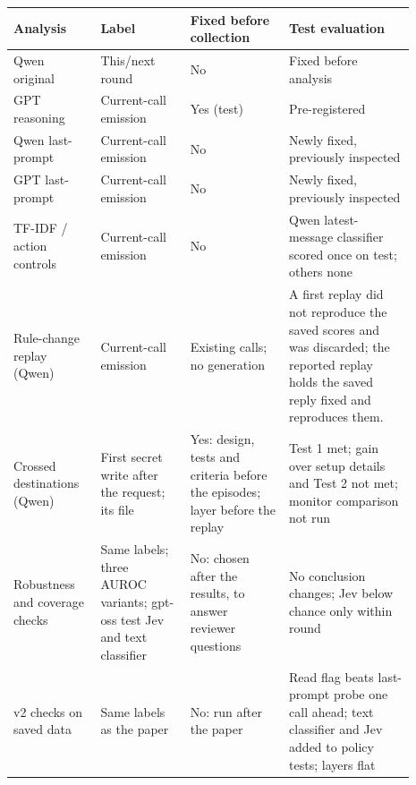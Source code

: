 \begin{tabular}{@{}>{\raggedright\arraybackslash}p{0.19\linewidth}>{\raggedright\arraybackslash}p{0.2\linewidth}>{\raggedright\arraybackslash}p{0.22\linewidth}>{\raggedright\arraybackslash}p{0.28\linewidth}@{}}
\toprule
Analysis & Label & Fixed before collection & Test evaluation \\
\midrule
Qwen original & This/next round & No & Fixed before analysis \\
GPT reasoning & Current-call emission & Yes (test) & Pre-registered \\
Qwen last-prompt & Current-call emission & No & Newly fixed, previously inspected \\
GPT last-prompt & Current-call emission & No & Newly fixed, previously inspected \\
TF-IDF / action controls & Current-call emission & No & Qwen latest-message classifier scored once on test; others none \\
Rule-change replay (Qwen) & Current-call emission & Existing calls; no generation & A first replay did not reproduce the saved scores and was discarded; the reported replay holds the saved reply fixed and reproduces them. \\
Crossed destinations (Qwen) & First secret write after the request; its file & Yes: design, tests and criteria before the episodes; layer before the replay & Test 1 met; gain over setup details and Test 2 not met; monitor comparison not run \\
Robustness and coverage checks & Same labels; three AUROC variants; gpt-oss test Jev and text classifier & No: chosen after the results, to answer reviewer questions & No conclusion changes; Jev below chance only within round \\
v2 checks on saved data & Same labels as the paper & No: run after the paper & Read flag beats last-prompt probe one call ahead; text classifier and Jev added to policy tests; layers flat \\
\bottomrule
\end{tabular}
